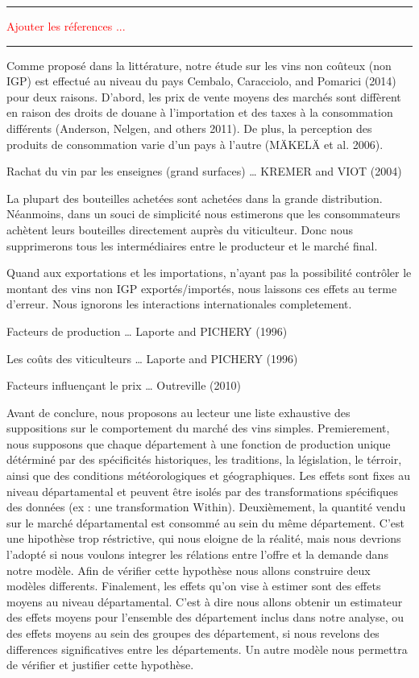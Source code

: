\documentclass[11pt,]{article}
\begin{document}
\noindent

\rule[0.5ex]{\linewidth}{1pt}

\textcolor{red}{Ajouter les réferences ...}

\noindent

\rule[0.5ex]{\linewidth}{1pt}

Comme proposé dans la littérature, notre étude sur les vins non coûteux
(non IGP) est effectué au niveau du pays Cembalo, Caracciolo, and
Pomarici (2014) pour deux raisons. D'abord, les prix de vente moyens des
marchés sont diffèrent en raison des droits de douane à l'importation et
des taxes à la consommation différents (Anderson, Nelgen, and others
2011). De plus, la perception des produits de consommation varie d'un
pays à l'autre (MÄKELÄ et al. 2006).

Rachat du vin par les enseignes (grand surfaces) \ldots{} KREMER and
VIOT (2004)

La plupart des bouteilles achetées sont achetées dans la grande
distribution. Néanmoins, dans un souci de simplicité nous estimerons que
les consommateurs achètent leurs bouteilles directement auprès du
viticulteur. Donc nous supprimerons tous les intermédiaires entre le
producteur et le marché final.

Quand aux exportations et les importations, n'ayant pas la possibilité
contrôler le montant des vins non IGP exportés/importés, nous laissons
ces effets au terme d'erreur. Nous ignorons les interactions
internationales completement.

Facteurs de production \ldots{} Laporte and PICHERY (1996)

Les coûts des viticulteurs \ldots{} Laporte and PICHERY (1996)

Facteurs influençant le prix \ldots{} Outreville (2010)

Avant de conclure, nous proposons au lecteur une liste exhaustive des
suppositions sur le comportement du marché des vins simples.
Premierement, nous supposons que chaque département à une fonction de
production unique détérminé par des spécificités historiques, les
traditions, la législation, le térroir, ainsi que des conditions
météorologiques et géographiques. Les effets sont fixes au niveau
départamental et peuvent être isolés par des transformations spécifiques
des données (ex : une transformation Within). Deuxièmement, la quantité
vendu sur le marché départamental est consommé au sein du même
département. C'est une hipothèse trop réstrictive, qui nous eloigne de
la réalité, mais nous devrions l'adopté si nous voulons integrer les
rélations entre l'offre et la demande dans notre modèle. Afin de
vérifier cette hypothèse nous allons construire deux modèles differents.
Finalement, les effets qu'on vise à estimer sont des effets moyens au
niveau départamental. C'est à dire nous allons obtenir un estimateur des
effets moyens pour l'ensemble des département inclus dans notre analyse,
ou des effets moyens au sein des groupes des département, si nous
revelons des differences significatives entre les départements. Un autre
modèle nous permettra de vérifier et justifier cette hypothèse.
\end{document}
